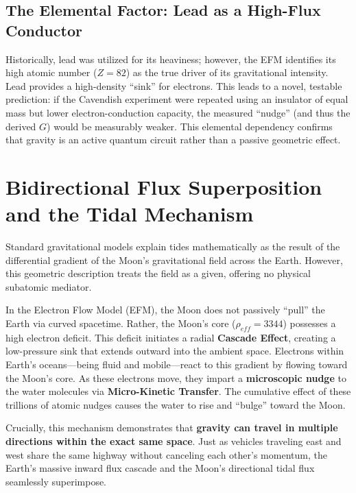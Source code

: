 \documentclass[11pt, a4paper]{article}
\begin{document}
\subsection{The Elemental Factor: Lead as a High-Flux Conductor}
Historically, lead was utilized for its heaviness; however, the EFM identifies its high atomic number ($Z=82$) as the true driver of its gravitational intensity. Lead provides a high-density ``sink'' for electrons. This leads to a novel, testable prediction: if the Cavendish experiment were repeated using an insulator of equal mass but lower electron-conduction capacity, the measured ``nudge'' (and thus the derived $G$) would be measurably weaker. This elemental dependency confirms that gravity is an active quantum circuit rather than a passive geometric effect.

\clearpage
\section{Bidirectional Flux Superposition and the Tidal Mechanism}

Standard gravitational models explain tides mathematically as the result of the differential gradient of the Moon's gravitational field across the Earth. However, this geometric description treats the field as a given, offering no physical subatomic mediator. 

In the Electron Flow Model (EFM), the Moon does not passively ``pull'' the Earth via curved spacetime. Rather, the Moon's core ($\rho_{eff} = 3344$) possesses a high electron deficit. This deficit initiates a radial \textbf{Cascade Effect}, creating a low-pressure sink that extends outward into the ambient space. Electrons within Earth's oceans—being fluid and mobile—react to this gradient by flowing toward the Moon's core. As these electrons move, they impart a \textbf{microscopic nudge} to the water molecules via \textbf{Micro-Kinetic Transfer}. The cumulative effect of these trillions of atomic nudges causes the water to rise and ``bulge'' toward the Moon.

Crucially, this mechanism demonstrates that \textbf{gravity can travel in multiple directions within the exact same space}. Just as vehicles traveling east and west share the same highway without canceling each other's momentum, the Earth's massive inward flux cascade and the Moon's directional tidal flux seamlessly superimpose.
\end{document}
